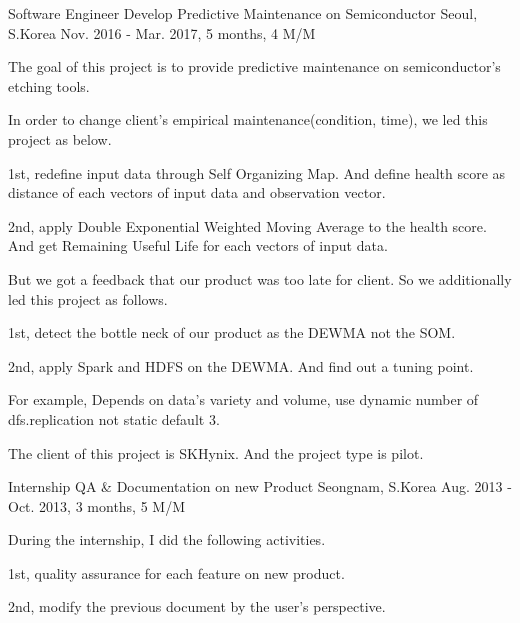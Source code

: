 \begin{cventries}
  \cventry
    {Software Engineer} %
    {Develop Predictive Maintenance on Semiconductor} %
    {Seoul, S.Korea} %
    {Nov. 2016 - Mar. 2017, 5 months, 4 M/M} %
    {
      \begin{cvitems} %
        \item {The goal of this project is to provide predictive maintenance on semiconductor's etching tools.}
        \item {In order to change client's empirical maintenance(condition, time), we led this project as below.}
        \item {1st, redefine input data through Self Organizing Map. And define health score as distance of each vectors of input data and observation vector.}        
        \item {2nd, apply Double Exponential Weighted Moving Average to the health score. And get Remaining Useful Life for each vectors of input data.}
        \item {But we got a feedback that our product was too late for client. So we additionally led this project as follows.}
        \item {1st, detect the bottle neck of our product as the DEWMA not the SOM.}        
        \item {2nd, apply Spark and HDFS on the DEWMA. And find out a tuning point.}
        \item {For example, Depends on data's variety and volume, use dynamic number of dfs.replication not static default 3.}
        \item {The client of this project is SKHynix. And the project type is pilot.}
      \end{cvitems}
    }

  \cventry
    {Internship} %
    {QA \& Documentation on new Product} %
    {Seongnam, S.Korea} %
    {Aug. 2013 - Oct. 2013, 3 months, 5 M/M} %
    {
      \begin{cvitems} %
        \item {During the internship, I did the following activities.}
        \item {1st, quality assurance for each feature on new product.}        
        \item {2nd, modify the previous document by the user's perspective.}
      \end{cvitems}
    }

\end{cventries}
